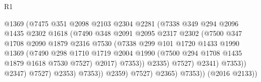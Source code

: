 \begin{lexlean}{R1}
\begin{coremodule}
                                    @1369
                                    (@7475
                                      @351
                                      @2098
                                      @2103
                                      @2304
                                      @2281
                                      (@7338
                                        @349
                                        @294
                                        @2096
                                        @1435
                                        @2302
                                        @1618
                                        (@7490
                                          @348
                                          @2091
                                          @2095
                                          @2317
                                          @2302
                                          (@7500
                                            @347
                                            @1708
                                            @2090
                                            @1879
                                            @2316
                                            @7530
                                            (@7338
                                              @299
                                              @101
                                              @1720
                                              @1433
                                              @1990
                                              @1369
                                              (@7490
                                                @298
                                                @1710
                                                @1719
                                                @2004
                                                @1990
                                                (@7500 @294 @1708 @1435 @1879 @1618 @7530 @7527)
                                                @2017)
                                              @7353))
                                          @2335)
                                        @7527)
                                      @2341)
                                    @7353))
                                @2347)
                              @7527)
                            @2353)
                          @7353))
                      @2359)
                    @7527)
                  @2365)
                @7353))
            (@2016 @2133))

\end{coremodule}
\end{lexlean}
